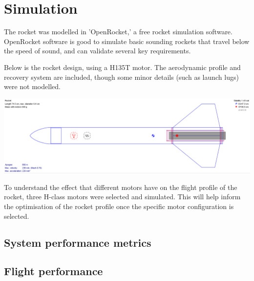 \documentclass{article}
\begin{document}
\section{Simulation}


The rocket was modelled in 'OpenRocket,' 
a free rocket simulation software. 
OpenRocket software is good to simulate basic sounding rockets that travel below the speed of sound, 
and can validate several key requirements.


Below is the rocket design, using a H135T motor. 
The aerodynamic profile and recovery system are included, 
though some minor details (such as launch lugs) were not modelled.

\includegraphics[width=\textwidth]{images/rocket model 7-5-23.png}

To understand the effect that different motors have on the flight profile of the rocket, 
three H-class motors were selected and simulated. 
This will help inform the optimisation of the rocket profile once the specific motor configuration is selected.


\subsection{System performance metrics}


\subsection{Flight performance}

\end{document}

